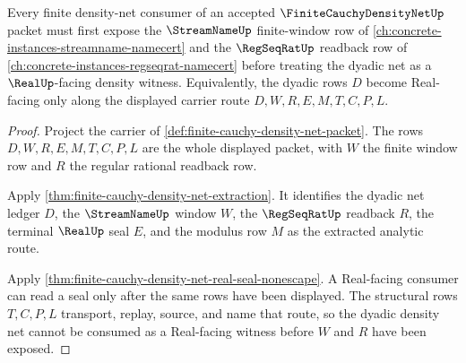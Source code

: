 \begin{theorem}
\label{thm:finite-cauchy-density-net-stream-route}
Every finite density-net consumer of an accepted $\FiniteCauchyDensityNetUp$ packet must first expose the $\StreamNameUp$ finite-window row of \autoref{ch:concrete-instances-streamname-namecert} and the $\RegSeqRatUp$ readback row of \autoref{ch:concrete-instances-regseqrat-namecert} before treating the dyadic net as a $\RealUp$-facing density witness. Equivalently, the dyadic rows $D$ become Real-facing only along the displayed carrier route $D,W,R,E,M,T,C,P,L$.
\end{theorem}
\begin{proof}
Project the carrier of \autoref{def:finite-cauchy-density-net-packet}. The rows $D,W,R,E,M,T,C,P,L$ are the whole displayed packet, with $W$ the finite window row and $R$ the regular rational readback row.

Apply \autoref{thm:finite-cauchy-density-net-extraction}. It identifies the dyadic net ledger $D$, the $\StreamNameUp$ window $W$, the $\RegSeqRatUp$ readback $R$, the terminal $\RealUp$ seal $E$, and the modulus row $M$ as the extracted analytic route.

Apply \autoref{thm:finite-cauchy-density-net-real-seal-nonescape}. A Real-facing consumer can read a seal only after the same rows have been displayed. The structural rows $T,C,P,L$ transport, replay, source, and name that route, so the dyadic density net cannot be consumed as a Real-facing witness before $W$ and $R$ have been exposed.
\end{proof}

